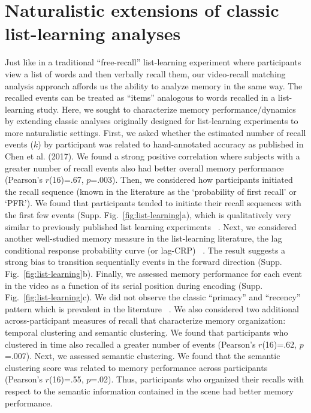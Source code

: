 \documentclass{article}
\begin{document}
{\section{Naturalistic extensions of classic list-learning analyses}
Just like in a traditional ``free-recall'' list-learning experiment where participants view a list of words and then verbally recall them, our video-recall matching analysis approach affords us the ability to analyze memory in the same way. The recalled events can be treated as ``items'' analogous to words recalled in a list-learning study. Here, we sought to characterize memory performance/dynamics by extending classic analyses originally designed for list-learning experiments to more naturalistic settings. First, we asked whether the estimated number of recall events ($k$) by participant was related to hand-annotated accuracy as published in Chen et al. (2017).  We found a strong positive correlation where subjects with a greater number of recall events also had better overall memory performance (Pearson's $r$(16)=.67, $p$=.003). Then, we considered how participants initiated the recall sequence (known in the literature as the `probability of first recall' or `PFR'). We found that participants tended to initiate their recall sequences with the first few events (Supp. Fig.~\ref{fig:list-learning}a), which is qualitatively very similar to previously published list learning experiments ~\citep{HowaKaha99}. Next, we considered another well-studied memory measure in the list-learning literature, the lag conditional response probability curve (or lag-CRP) ~\citep{Kaha96}. The result suggests a strong bias to transition sequentially events in the forward direction (Supp. Fig.~\ref{fig:list-learning}b). Finally, we assessed memory performance for each event in the video as a function of its serial position during encoding (Supp. Fig.~\ref{fig:list-learning}c). We did not observe the classic ``primacy'' and ``recency'' pattern which is prevalent in the literature ~\citep{Murd62a}. We also considered two additional across-participant measures of recall that characterize memory organization: temporal clustering and semantic clustering. We found that participants who clustered in time also recalled a greater number of events (Pearson's $r$(16)=.62, $p$=.007). Next, we assessed semantic clustering. We found that the semantic clustering score was related to memory performance across participants (Pearson's $r$(16)=.55, $p$=.02).  Thus, participants who organized their recalls with respect to the semantic information contained in the scene had better memory performance.

}
\end{document}
